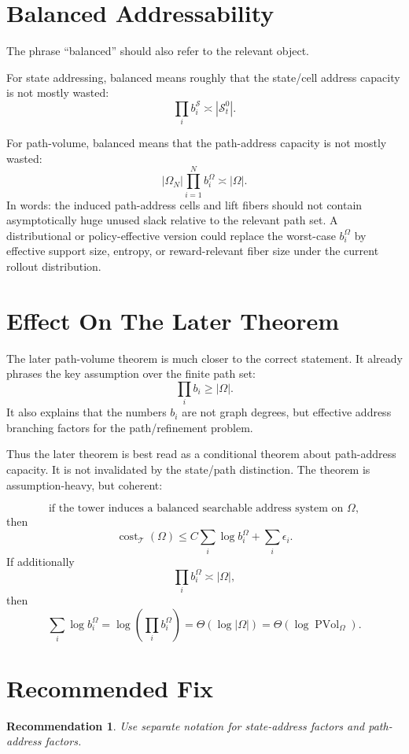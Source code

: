 \documentclass[11pt]{article}
\newcommand{\PVol}{\operatorname{PVol}}
\newcommand{\cost}{\operatorname{cost}}
\newtheorem{recommendation}{Recommendation}
\begin{document}
\section*{Balanced Addressability}

The phrase ``balanced'' should also refer to the relevant object.

For state addressing, balanced means roughly that the state/cell address capacity is not mostly wasted:
\[
    \prod_i b_i^{\mathcal S}
    \asymp
    |\mathcal S_t^0|.
\]

For path-volume, balanced means that the path-address capacity is not mostly wasted:
\[
    |\Omega_N|\prod_{i=1}^{N} b_i^\Omega
    \asymp
    |\Omega|.
\]
In words: the induced path-address cells and lift fibers should not contain asymptotically huge unused slack relative to the relevant path set.  A distributional or policy-effective version could replace the worst-case \(b_i^\Omega\) by effective support size, entropy, or reward-relevant fiber size under the current rollout distribution.

\section*{Effect On The Later Theorem}

The later path-volume theorem is much closer to the correct statement.  It already phrases the key assumption over the finite path set:
\[
    \prod_i b_i \ge |\Omega|.
\]
It also explains that the numbers \(b_i\) are not graph degrees, but effective address branching factors for the path/refinement problem.

Thus the later theorem is best read as a conditional theorem about path-address capacity.  It is not invalidated by the state/path distinction.  The theorem is assumption-heavy, but coherent:

\[
    \text{if the tower induces a balanced searchable address system on }\Omega,
\]
then
\[
    \cost_{\mathcal T}(\Omega)
    \le
    C\sum_i \log b_i^\Omega
    +
    \sum_i\epsilon_i.
\]
If additionally
\[
    \prod_i b_i^\Omega\asymp |\Omega|,
\]
then
\[
    \sum_i\log b_i^\Omega
    =
    \log\left(\prod_i b_i^\Omega\right)
    =
    \Theta(\log|\Omega|)
    =
    \Theta(\log \PVol_\Omega).
\]

\section*{Recommended Fix}

\begin{recommendation}
Use separate notation for state-address factors and path-address factors.
\end{recommendation}
\end{document}
